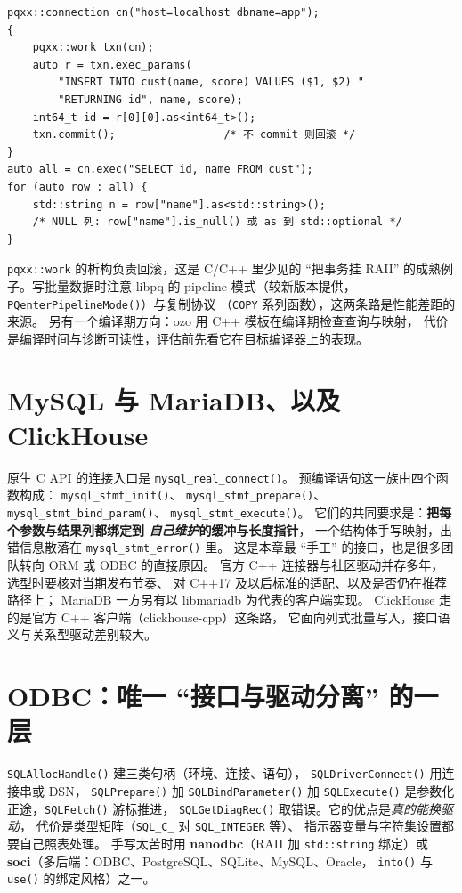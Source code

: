 \documentclass[12pt,a4paper,fontset=fandol]{ctexbook}
\newcommand{\cpp}[1]{C++#1}
\newcommand{\Fn}[1]{\texttt{#1()}}
\newcommand{\Tp}[1]{\texttt{#1}}
\newcommand{\CppJava}{C/C++}
\begin{document}
\begin{lstlisting}[caption={libpqxx 8：事务与结果访问}]
pqxx::connection cn("host=localhost dbname=app");
{
    pqxx::work txn(cn);
    auto r = txn.exec_params(
        "INSERT INTO cust(name, score) VALUES ($1, $2) "
        "RETURNING id", name, score);
    int64_t id = r[0][0].as<int64_t>();
    txn.commit();                 /* 不 commit 则回滚 */
}
auto all = cn.exec("SELECT id, name FROM cust");
for (auto row : all) {
    std::string n = row["name"].as<std::string>();
    /* NULL 列: row["name"].is_null() 或 as 到 std::optional */
}
\end{lstlisting}

\Tp{pqxx::work} 的析构负责回滚，这是 \CppJava{} 里少见的
``把事务挂 RAII'' 的成熟例子。写批量数据时注意
libpq 的 pipeline 模式（较新版本提供，
\Fn{PQenterPipelineMode}）与复制协议
（\texttt{COPY} 系列函数），这两条路是性能差距的来源。
另有一个编译期方向：ozo 用 C++ 模板在编译期检查查询与映射，
代价是编译时间与诊断可读性，评估前先看它在目标编译器上的表现。

\section{MySQL 与 MariaDB、以及 ClickHouse}

原生 C API 的连接入口是 \Fn{mysql\_real\_\allowbreak connect}。
预编译语句这一族由四个函数构成：
\Fn{mysql\_stmt\_\allowbreak init}、
\Fn{mysql\_stmt\_\allowbreak prepare}、
\Fn{mysql\_stmt\_\allowbreak bind\_param}、
\Fn{mysql\_stmt\_\allowbreak execute}。
它们的共同要求是：\textbf{把每个参数与结果列都绑定到
\emph{自己维护}的缓冲与长度指针}，
一个结构体手写映射，出错信息散落在
\Fn{mysql\_stmt\_\allowbreak error} 里。
这是本章最 ``手工'' 的接口，也是很多团队转向 ORM 或 ODBC 的直接原因。
官方 C++ 连接器与社区驱动并存多年，选型时要核对当期发布节奏、
对 \cpp{17} 及以后标准的适配、以及是否仍在推荐路径上；
MariaDB 一方另有以 libmariadb 为代表的客户端实现。
ClickHouse 走的是官方 C++ 客户端（clickhouse-cpp）这条路，
它面向列式批量写入，接口语义与关系型驱动差别较大。

\section{ODBC：唯一 ``接口与驱动分离'' 的一层}

\Fn{SQLAllocHandle} 建三类句柄（环境、连接、语句），
\Fn{SQLDriverConnect} 用连接串或 DSN，
\Fn{SQLPrepare} 加 \Fn{SQLBindParameter} 加
\Fn{SQLExecute} 是参数化正途，\Fn{SQLFetch} 游标推进，
\Fn{SQLGetDiagRec} 取错误。它的优点是\emph{真的能换驱动}，
代价是类型矩阵（\Tp{SQL\_C\_} 对 \Tp{SQL\_INTEGER} 等）、
指示器变量与字符集设置都要自己照表处理。
手写太苦时用 \textbf{nanodbc}（RAII 加 \Tp{std::string} 绑定）或
\textbf{soci}（多后端：ODBC、PostgreSQL、SQLite、MySQL、Oracle，
\Fn{into} 与 \Fn{use} 的绑定风格）之一。
\end{document}
